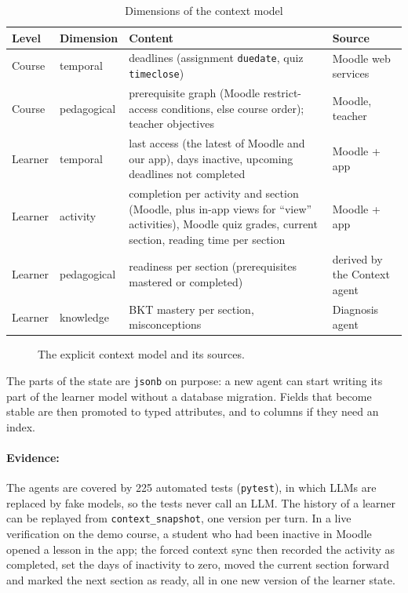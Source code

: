 \begin{table}[htbp]
\centering
\caption{Dimensions of the context model}
\label{tab-context-dimensions}
\small
\begin{tabularx}{\textwidth}{@{}L{1.5cm}L{2.1cm}YL{2.8cm}@{}}
\toprule
\textbf{Level} & \textbf{Dimension} & \textbf{Content} & \textbf{Source} \\
\midrule
Course & temporal & deadlines (assignment \texttt{duedate}, quiz \texttt{timeclose}) & Moodle web services \\
Course & pedagogical & prerequisite graph (Moodle restrict-access conditions, else course order); teacher objectives & Moodle, teacher \\
Learner & temporal & last access (the latest of Moodle and our app), days inactive, upcoming deadlines not completed & Moodle + app \\
Learner & activity & completion per activity and section (Moodle, plus in-app views for ``view'' activities), Moodle quiz grades, current section, reading time per section & Moodle + app \\
Learner & pedagogical & readiness per section (prerequisites mastered or completed) & derived by the Context agent \\
Learner & knowledge & BKT mastery per section, misconceptions & Diagnosis agent \\
\bottomrule
\end{tabularx}
\end{table}

\begin{figure}[htbp]
  \centering
  \caption{The explicit context model and its sources.}
  \label{fig-context-model}
\end{figure}

The parts of the state are \texttt{jsonb} on purpose: a new agent can
start writing its part of the learner model without a database
migration. Fields that become stable are then promoted to typed
attributes, and to columns if they need an index.

\paragraph{Evidence:} The agents are covered by 225 automated tests
(\texttt{pytest}), in which LLMs are replaced by fake models, so the tests
never call an LLM. The history of a learner can be replayed from
\texttt{context\_snapshot}, one version per turn. In a
live verification on the demo course, a student who had been inactive in
Moodle opened a lesson in the app; the forced context sync then recorded
the activity as completed, set the days of inactivity to zero, moved the
current section forward and marked the next section as ready, all in one
new version of the learner state.


